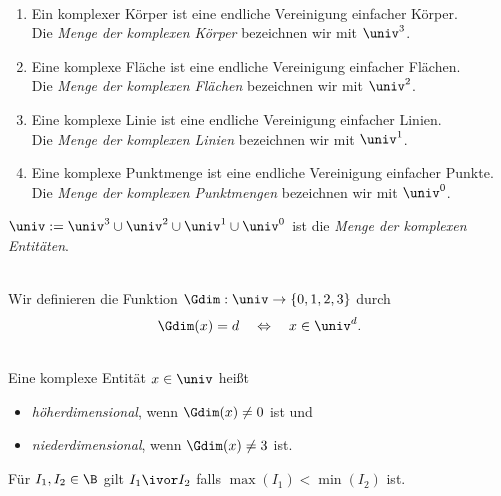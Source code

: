 \begin{dfn}\
    \begin{enumerate}
        \item Ein komplexer Körper ist eine endliche Vereinigung einfacher Körper.\\
            Die \emph{Menge der komplexen Körper} bezeichnen wir mit $\univ^3$.
        \item Eine komplexe Fläche ist eine endliche Vereinigung einfacher Flächen.\\
            Die \emph{Menge der komplexen Flächen} bezeichnen wir mit $\univ^2$.
        \item Eine komplexe Linie ist eine endliche Vereinigung einfacher Linien.\\
            Die \emph{Menge der komplexen Linien} bezeichnen wir mit $\univ^1$.
        \item Eine komplexe Punktmenge ist eine endliche Vereinigung einfacher Punkte.\\
            Die \emph{Menge der komplexen Punktmengen} bezeichnen wir mit $\univ^0$.
    \end{enumerate}
    $\univ := \univ^3 \cup \univ^2 \cup \univ^1 \cup \univ^0$ ist die \emph{Menge der komplexen Entitäten}.
\end{dfn}


\begin{dfn}\ \\
    Wir definieren die Funktion $\Gdim : \univ \to \{0,1,2,3\}$ durch
    $$\Gdim(x) = d \quad \Leftrightarrow \quad x \in \univ^d.$$
\end{dfn}


\begin{dfn}\ \\
    Eine komplexe Entität $x \in \univ$ heißt
    \begin{itemize}
        \item \emph{höherdimensional}, wenn $\Gdim(x) \neq 0$ ist und
        \item \emph{niederdimensional}, wenn $\Gdim(x) \neq 3$ ist.
    \end{itemize}
\end{dfn}

\begin{dfn}
    Für $I_1, I_2 \in \B$ gilt $I_1 \ivor I_2$ falls $\max(I_1) < \min(I_2)$ ist.
\end{dfn}


